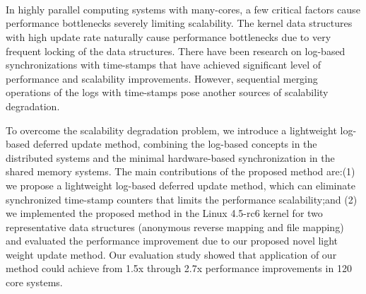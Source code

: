 \documentclass[doctor,korean,final]{kmu}
\begin{document}
\normalsize{
\hfill \break
\begin{center}
\\
\\
\\
\end{center}
\hfill \break

In highly parallel computing systems with many-cores, a few critical factors
cause performance bottlenecks severely limiting scalability.
The kernel data structures with high update rate naturally cause performance
bottlenecks due to very frequent locking of the data structures.
There have been research on log-based synchronizations with time-stamps that
have achieved significant level of performance and scalability improvements.
However, sequential merging operations of the logs with time-stamps pose another
sources of scalability degradation.

To overcome the scalability degradation problem, we introduce a lightweight
log-based deferred update method, combining the log-based concepts in the
distributed systems and the minimal hardware-based synchronization in the
shared memory systems.
The main contributions of the proposed method are:(1) we propose a lightweight
log-based deferred update method, which can eliminate synchronized time-stamp
counters that limits the performance scalability;and (2) we implemented the
 proposed method in the Linux 4.5-rc6 kernel for two representative data
 structures (anonymous reverse mapping and file mapping) and evaluated the
performance improvement due to our proposed novel light weight update method.
Our evaluation study showed that application of our method could
achieve from 1.5x through 2.7x performance improvements in 120 core
systems.}

\end{document}
